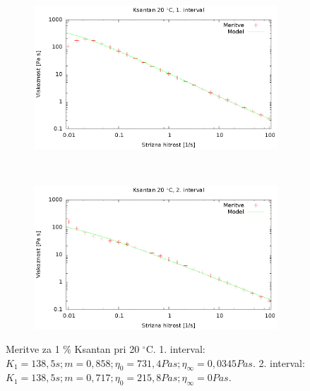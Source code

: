 \documentclass{article}
\begin{document}
\begin{figure}[H]
	\centering
	\begin{subfigure}[b]{0.45\linewidth}
	       \includegraphics[width=\linewidth]{cross_ksan1.eps}
	   \end{subfigure}
	   ~
	   \begin{subfigure}[b]{0.45\linewidth}
	       \includegraphics[width=\linewidth]{cross_ksan2.eps}
	   \end{subfigure}
	\caption{Meritve za 1 \% Ksantan pri 20 $^\circ$C. 1. interval: $K_1 = 138,5 s; m = 0,858; \eta_0 = 731,4 Pa s; \eta_\infty = 0,0345 Pa s$. 2. interval: $K_1 = 138,5 s; m = 0,717; \eta_0 = 215,8 Pa s; \eta_\infty = 0 Pa s$.}
	\label{fig:cross_xan1}
\end{figure}
\end{document}
